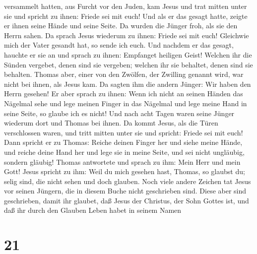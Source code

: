 versammelt hatten, aus Furcht vor den Juden, kam Jesus und trat mitten
unter sie und spricht zu ihnen: Friede sei mit euch!  Und
als er das gesagt hatte, zeigte er ihnen seine Hände und seine Seite. Da
wurden die Jünger froh, als sie den Herrn sahen.  Da
sprach Jesus wiederum zu ihnen: Friede sei mit euch! Gleichwie mich der
Vater gesandt hat, so sende ich euch.  Und nachdem er das
gesagt, hauchte er sie an und sprach zu ihnen: Empfanget heiligen Geist!
 Welchen ihr die Sünden vergebet, denen sind sie
vergeben; welchen ihr sie behaltet, denen sind sie behalten.
 Thomas aber, einer von den Zwölfen, der Zwilling genannt
wird, war nicht bei ihnen, als Jesus kam.  Da sagten ihm
die andern Jünger: Wir haben den Herrn gesehen! Er aber sprach zu ihnen:
Wenn ich nicht an seinen Händen das Nägelmal sehe und lege meinen Finger
in das Nägelmal und lege meine Hand in seine Seite, so glaube ich es
nicht!  Und nach acht Tagen waren seine Jünger wiederum
dort und Thomas bei ihnen. Da kommt Jesus, als die Türen verschlossen
waren, und tritt mitten unter sie und spricht: Friede sei mit euch!
 Dann spricht er zu Thomas: Reiche deinen Finger her und
siehe meine Hände, und reiche deine Hand her und lege sie in meine
Seite, und sei nicht ungläubig, sondern gläubig!  Thomas
antwortete und sprach zu ihm: Mein Herr und mein Gott! 
Jesus spricht zu ihm: Weil du mich gesehen hast, Thomas, so glaubst du;
selig sind, die nicht sehen und doch glauben.  Noch viele
andere Zeichen tat Jesus vor seinen Jüngern, die in diesem Buche nicht
geschrieben sind.  Diese aber sind geschrieben, damit ihr
glaubet, daß Jesus der Christus, der Sohn Gottes ist, und daß ihr durch
den Glauben Leben habet in seinem Namen

\hypertarget{section-20}{%
\section{21}\label{section-20}}


